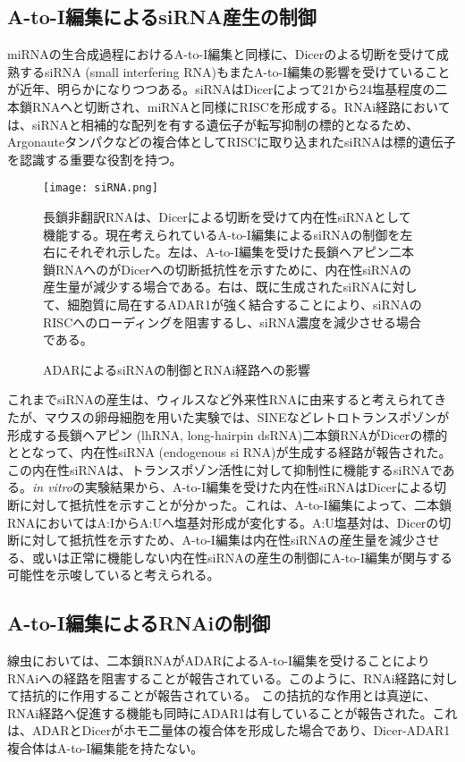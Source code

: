 \subsection{A-to-I編集によるsiRNA産生の制御}
miRNAの生合成過程におけるA-to-I編集と同様に、Dicerのよる切断を受けて成熟するsiRNA (small interfering RNA)もまたA-to-I編集の影響を受けていることが近年、明らかになりつつある。siRNAはDicerによって21から24塩基程度の二本鎖RNAへと切断され、miRNAと同様にRISCを形成する。RNAi経路においては、siRNAと相補的な配列を有する遺伝子が転写抑制の標的となるため、Argonauteタンパクなどの複合体としてRISCに取り込まれたsiRNAは標的遺伝子を認識する重要な役割を持つ。

\begin{figure}[!h]
	\begin{center}
		\texttt{[image: siRNA.png]}
	\end{center}
	\caption{ADARによるsiRNAの制御とRNAi経路への影響}
	\begin{flushleft}
		\small{長鎖非翻訳RNAは、Dicerによる切断を受けて内在性siRNAとして機能する。現在考えられているA-to-I編集によるsiRNAの制御を左右にそれぞれ示した。左は、A-to-I編集を受けた長鎖ヘアピン二本鎖RNAへのがDicerへの切断抵抗性を示すために、内在性siRNAの産生量が減少する場合である。右は、既に生成されたsiRNAに対して、細胞質に局在するADAR1が強く結合することにより、siRNAのRISCへのローディングを阻害するし、siRNA濃度を減少させる場合である。}
	\end{flushleft}
	\label{fig:adar_siRNA}
\end{figure}

これまでsiRNAの産生は、ウィルスなど外来性RNAに由来すると考えられてきたが、マウスの卵母細胞を用いた実験では、SINEなどレトロトランスポゾンが形成する長鎖ヘアピン (lhRNA, long-hairpin dsRNA)二本鎖RNAがDicerの標的ととなって、内在性siRNA (endogenous si RNA)が生成する経路が報告された。この内在性siRNAは、トランスポゾン活性に対して抑制性に機能するsiRNAである。\textit{in vitro}の実験結果から、A-to-I編集を受けた内在性siRNAはDicerによる切断に対して抵抗性を示すことが分かった。これは、A-to-I編集によって、二本鎖RNAにおいてはA:IからA:Uへ塩基対形成が変化する。A:U塩基対は、Dicerの切断に対して抵抗性を示すため、A-to-I編集は内在性siRNAの産生量を減少させる、或いは正常に機能しない内在性siRNAの産生の制御にA-to-I編集が関与する可能性を示唆していると考えられる。

\subsection{A-to-I編集によるRNAiの制御}
線虫においては、二本鎖RNAがADARによるA-to-I編集を受けることによりRNAiへの経路を阻害することが報告されている。このように、RNAi経路に対して拮抗的に作用することが報告されている。
この拮抗的な作用とは真逆に、RNAi経路へ促進する機能も同時にADAR1は有していることが報告された。これは、ADARとDicerがホモ二量体の複合体を形成した場合であり、Dicer-ADAR1複合体はA-to-I編集能を持たない。

